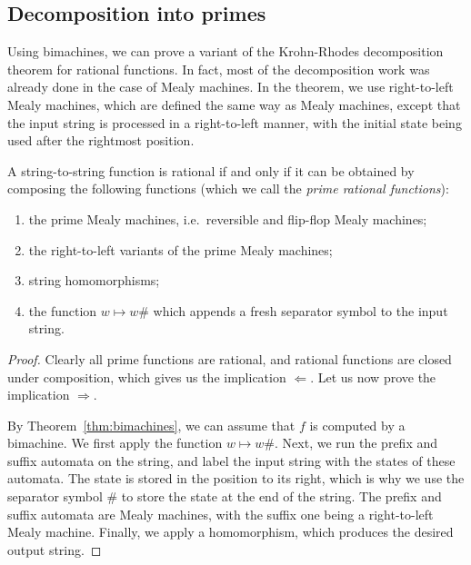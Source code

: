 \subsection{Decomposition into primes}
\label{sec:rational-primes}
 Using bimachines, we can prove a variant of the Krohn-Rhodes decomposition theorem for rational functions. In fact, most of the decomposition work was already done in the case of Mealy machines. In the theorem, we use right-to-left Mealy machines, which are defined the same way as Mealy machines, except that the input string is processed in a right-to-left manner, with the initial state being used after the rightmost position.
\begin{theorem}\label{thm:rational-primes}
    A string-to-string function is rational if and only if it can be obtained by composing the following functions (which we call the \emph{prime rational functions}): 
    \begin{enumerate}
        \item the prime Mealy machines, i.e.~reversible and flip-flop Mealy machines;
        \item the right-to-left variants of the prime Mealy machines;
        \item string homomorphisms;
        \item the function $w \mapsto w\#$ which appends a fresh separator symbol to the input string.
    \end{enumerate}
\end{theorem}
\begin{proof}
    Clearly all prime functions are rational, and rational functions are closed under composition, which gives us the implication $\Leftarrow$. Let us now prove the implication $\Rightarrow$. 
    
    By Theorem~\ref{thm:bimachines}, we can assume that $f$ is computed by a bimachine.  We first apply the function $w \mapsto w\#$. Next, we run the prefix and suffix automata on the string, and label the input string with the states of these automata. The state is stored in the position to its right, which is why we use the separator symbol $\#$ to store the state at the end of the string. The prefix and suffix automata are Mealy machines, with the suffix one being a right-to-left Mealy machine. Finally, we apply a homomorphism, which produces the desired output string. 
\end{proof}











